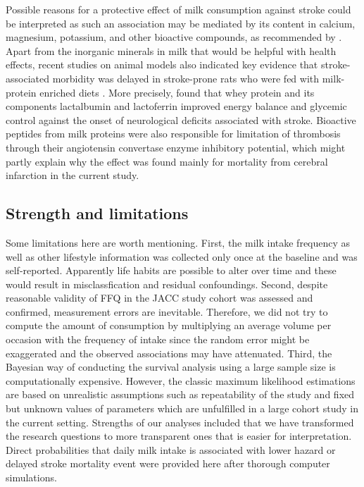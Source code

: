 \documentclass[nutrients,article,submitted,moreauthors,pdftex]{Definitions/mdpi}
\begin{document}
Possible reasons for a protective effect of milk consumption against
stroke could be interpreted as such an association may be mediated by
its content in calcium, magnesium, potassium, and other bioactive
compounds, as recommended by \citet{Iacoviello2018}. Apart from the
inorganic minerals in milk that would be helpful with health effects,
recent studies on animal models also indicated key evidence that
stroke-associated morbidity was delayed in stroke-prone rats who were
fed with milk-protein enriched diets \citep{Chiba2012, singh2016diets}.
More precisely, \citet{Singh2020} found that whey protein and its
components lactalbumin and lactoferrin improved energy balance and
glycemic control against the onset of neurological deficits associated
with stroke. Bioactive peptides from milk proteins were also responsible
for limitation of thrombosis \citep{tokajuk2019whey} through their
angiotensin convertase enzyme inhibitory potential, which might partly
explain why the effect was found mainly for mortality from cerebral
infarction in the current study.

\hypertarget{strength-and-limitations}{%
\subsection{Strength and limitations}\label{strength-and-limitations}}

Some limitations here are worth mentioning. First, the milk intake
frequency as well as other lifestyle information was collected only once
at the baseline and was self-reported. Apparently life habits are
possible to alter over time and these would result in misclassfication
and residual confoundings. Second, despite reasonable validity of FFQ in
the JACC study cohort was assessed and confirmed, measurement errors are
inevitable. Therefore, we did not try to compute the amount of
consumption by multiplying an average volume per occasion with the
frequency of intake since the random error might be exaggerated and the
observed associations may have attenuated. Third, the Bayesian way of
conducting the survival analysis using a large sample size is
computationally expensive. However, the classic maximum likelihood
estimations are based on unrealistic assumptions such as repeatability
of the study and fixed but unknown values of parameters which are
unfulfilled in a large cohort study in the current setting. Strengths of
our analyses included that we have transformed the research questions to
more transparent ones that is easier for interpretation. Direct
probabilities that daily milk intake is associated with lower hazard or
delayed stroke mortality event were provided here after thorough
computer simulations.
\end{document}
